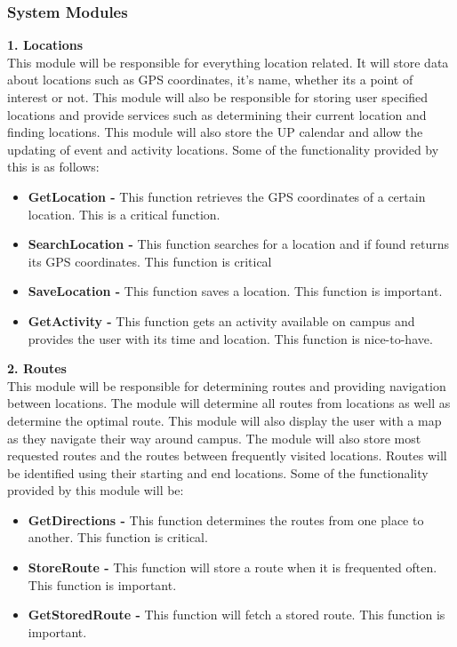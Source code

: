 \documentclass[a4paper,12pt]{article}
\begin{document}
\subsubsection{System Modules}
\textbf{1. Locations}\\
This module will be responsible for everything location related. It will store data about locations such as GPS coordinates, it's name, whether its a point of interest or not. This module will also be responsible for storing user specified locations and provide services such as determining their current location and finding locations. This module will also store the UP calendar and allow the updating of event and activity locations. Some of the functionality provided by this is as follows:
\begin{itemize}
\item \textbf{GetLocation -} This function retrieves the GPS coordinates of a certain location. This is a critical function.
\item \textbf{SearchLocation -} This function searches for a location and if found returns its GPS coordinates. This function is critical
\item \textbf{SaveLocation -} This function saves a location. This function is important.
\item \textbf{GetActivity -} This function gets an activity available on campus and provides the user with its time and location. This function is nice-to-have.
\end{itemize}

\textbf{2. Routes}\\
This module will be responsible for determining routes and providing navigation between locations. The module will determine all routes from locations as well as determine the optimal route. This module will also display the user with a map as they navigate their way around campus. The module will also store most requested routes and the routes between frequently visited locations. Routes will be identified using their starting and end locations. Some of the functionality provided by this module will be:
\begin{itemize}
\item \textbf{GetDirections -} This function determines the routes from one place to another. This function is critical.
\item \textbf{StoreRoute - } This function will store a route when it is frequented often. This function is important.
\item \textbf{GetStoredRoute - } This function will fetch a stored route. This function is important.
\end{itemize}
\end{document}
